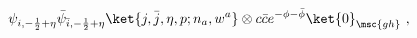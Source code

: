 \begin{equation}
\psi_{i,-\frac{1}{2} + \eta}\bar{\psi}_{\bar{i},-\frac{1}{2} + \eta} 
\ket{j,\bar{j},\eta,p;n_a,w^a} 
    \otimes c\bar{c} e^{-\phi-\bar{\phi}} \ket{0}_{\msc{gh}} ~,
\label{phys T4 momenta}
\end{equation}

